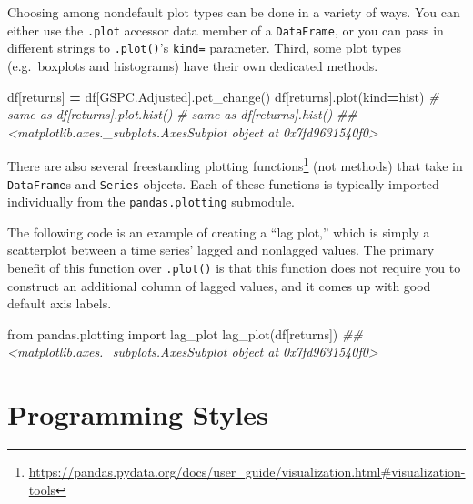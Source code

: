 \documentclass[
  12pt,
  krantz2]{krantz}
\makeatletter
\newenvironment{Shaded}{\begin{snugshade}}{\end{snugshade}}
\newcommand{\CommentTok}[1]{\textcolor[rgb]{0.37,0.37,0.37}{\textit{#1}}}
\newcommand{\ImportTok}[1]{#1}
\newcommand{\NormalTok}[1]{#1}
\newcommand{\OperatorTok}[1]{\textcolor[rgb]{0.43,0.43,0.43}{\textbf{#1}}}
\newcommand{\StringTok}[1]{\textcolor[rgb]{0.5,0.5,0.5}{#1}}
\renewcommand{\href}[2]{#2\footnote{\url{#1}}}
\newenvironment{kframe}{%
\medskip{}
\setlength{\fboxsep}{.8em}
 \def\at@end@of@kframe{}%
 \ifinner\ifhmode%
  \def\at@end@of@kframe{\end{minipage}}%
  \begin{minipage}{\columnwidth}%
 \fi\fi%
 \def\FrameCommand##1{\hskip\@totalleftmargin \hskip-\fboxsep
 \colorbox{shadecolor}{##1}\hskip-\fboxsep
     \hskip-\linewidth \hskip-\@totalleftmargin \hskip\columnwidth}%
 \MakeFramed {\advance\hsize-\width
   \@totalleftmargin\z@ \linewidth\hsize
   \@setminipage}}%
 {\par\unskip\endMakeFramed%
 \at@end@of@kframe}
\renewenvironment{Shaded}{\begin{kframe}}{\end{kframe}}
\makeatother
\begin{document}
Choosing among nondefault plot types can be done in a variety of ways. You can either use the \texttt{.plot} accessor data member of a \texttt{DataFrame}, or you can pass in different strings to \texttt{.plot()}'s \texttt{kind=} parameter. Third, some plot types (e.g.~boxplots and histograms) have their own dedicated methods.

\begin{Shaded}
\begin{Highlighting}[]
\NormalTok{df[}\StringTok{\textquotesingle{}returns\textquotesingle{}}\NormalTok{] }\OperatorTok{=}\NormalTok{ df[}\StringTok{\textquotesingle{}GSPC.Adjusted\textquotesingle{}}\NormalTok{].pct\_change()}
\NormalTok{df[}\StringTok{\textquotesingle{}returns\textquotesingle{}}\NormalTok{].plot(kind}\OperatorTok{=}\StringTok{\textquotesingle{}hist\textquotesingle{}}\NormalTok{)}
\CommentTok{\# same as df[\textquotesingle{}returns\textquotesingle{}].plot.hist()}
\CommentTok{\# same as df[\textquotesingle{}returns\textquotesingle{}].hist()}
\CommentTok{\#\# \textless{}matplotlib.axes.\_subplots.AxesSubplot object at 0x7fd9631540f0\textgreater{}}
\end{Highlighting}
\end{Shaded}

There are also \href{https://pandas.pydata.org/docs/user_guide/visualization.html\#visualization-tools}{several freestanding plotting functions} (not methods) that take in \texttt{DataFrame}s and \texttt{Series} objects. Each of these functions is typically imported individually from the \texttt{pandas.plotting} submodule.

The following code is an example of creating a ``lag plot,'' which is simply a scatterplot between a time series' lagged and nonlagged values. The primary benefit of this function over \texttt{.plot()} is that this function does not require you to construct an additional column of lagged values, and it comes up with good default axis labels.

\begin{Shaded}
\begin{Highlighting}[]
\ImportTok{from}\NormalTok{ pandas.plotting }\ImportTok{import}\NormalTok{ lag\_plot}
\NormalTok{lag\_plot(df[}\StringTok{\textquotesingle{}returns\textquotesingle{}}\NormalTok{])}
\CommentTok{\#\# \textless{}matplotlib.axes.\_subplots.AxesSubplot object at 0x7fd9631540f0\textgreater{}}
\end{Highlighting}
\end{Shaded}

\hypertarget{part-programming-styles}{%
\part{Programming Styles}\label{part-programming-styles}}
\end{document}
